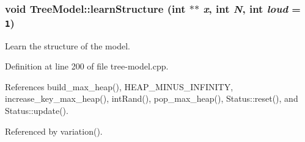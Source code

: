 \hypertarget{class_tree_model_3b38e54adca6bff1c6ec8eeb05cc3f24}{
\subsubsection[learnStructure]{\setlength{\rightskip}{0pt plus 5cm}void Tree\-Model::learn\-Structure (int $\ast$$\ast$ {\em x}, int {\em N}, int {\em loud} = {\tt 1})}}
\label{class_tree_model_3b38e54adca6bff1c6ec8eeb05cc3f24}


Learn the structure of the model. 



Definition at line 200 of file tree-model.cpp.

References build\_\-max\_\-heap(), HEAP\_\-MINUS\_\-INFINITY, increase\_\-key\_\-max\_\-heap(), int\-Rand(), pop\_\-max\_\-heap(), Status::reset(), and Status::update().

Referenced by variation().

